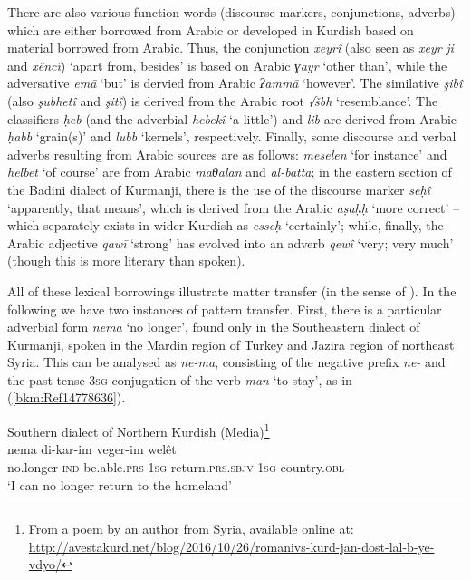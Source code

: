 \documentclass[output=paper]{langsci/langscibook}
\begin{document}
There are also various function words (discourse markers, conjunctions, adverbs) which are either borrowed from Arabic or developed in Kurdish based on material borrowed from Arabic. Thus, the conjunction \textit{xeyrî} (also seen as \textit{xeyr} \textit{ji} and \textit{xêncî}) ‘apart from, besides’ is based on Arabic \textit{ɣayr} ‘other than’, while the adversative \textit{emā} ‘but’ is dervied from Arabic \textit{ʔammā} ‘however’. The similative \textit{şibî} (also \textit{şubhetî} and \textit{şitî}) is derived from the Arabic root \textit{√šbh} ‘resemblance’. The classifiers \textit{ḥeb} (and the adverbial \textit{hebekî} ‘a little’) and \textit{lib} are derived from Arabic \textit{ḥabb} ‘grain(s)’ and \textit{lubb} ‘kernels’, respectively. Finally, some discourse and verbal adverbs resulting from Arabic sources are as follows: \textit{meselen} ‘for instance’ and \textit{helbet} ‘of course’ are from Arabic \textit{maθalan} and \textit{al-batta}; in the eastern section of the Badini dialect of Kurmanji, there is the use of the discourse marker \textit{seḥî} ‘apparently, that means’, which is derived from the Arabic \textit{aṣaḥḥ} ‘more correct’ – which separately exists in wider Kurdish as \textit{esseḥ} ‘certainly’; while, finally, the Arabic adjective \textit{qawī} ‘strong’ has evolved into an adverb \textit{qewî} ‘very; very much’ (though this is more literary than spoken).      

All of these lexical borrowings illustrate matter transfer (in the sense of \citealt{MatrasSakel2007}). In the following we have two instances of pattern transfer. First, there is a particular adverbial form \textit{nema} ‘no longer’, found only in the Southeastern dialect of Kurmanji, spoken in the Mardin region of Turkey and Jazira region of northeast Syria. This can be analysed as \textit{ne-ma}, consisting of the negative prefix \textit{ne-} and the past tense 3\textsc{sg} conjugation of the verb \textit{man} ‘to stay’, as in (\ref{bkm:Ref14778636}).

\ea
Southern dialect of Northern Kurdish (Media)\label{bkm:Ref14778636}\footnote{From a poem by an author from Syria, available online at: \url{http://avestakurd.net/blog/2016/10/26/romanivs-kurd-jan-dost-lal-b-ye-vdyo/}} \\
\gll nema di-kar-im veger-im welêt\\
     no.longer \textsc{ind}{}-be.able.\textsc{prs-1sg} return.\textsc{prs.sbjv-1sg} country.\textsc{obl}\\
\glt `I can no longer return to the homeland'\z
\end{document}

